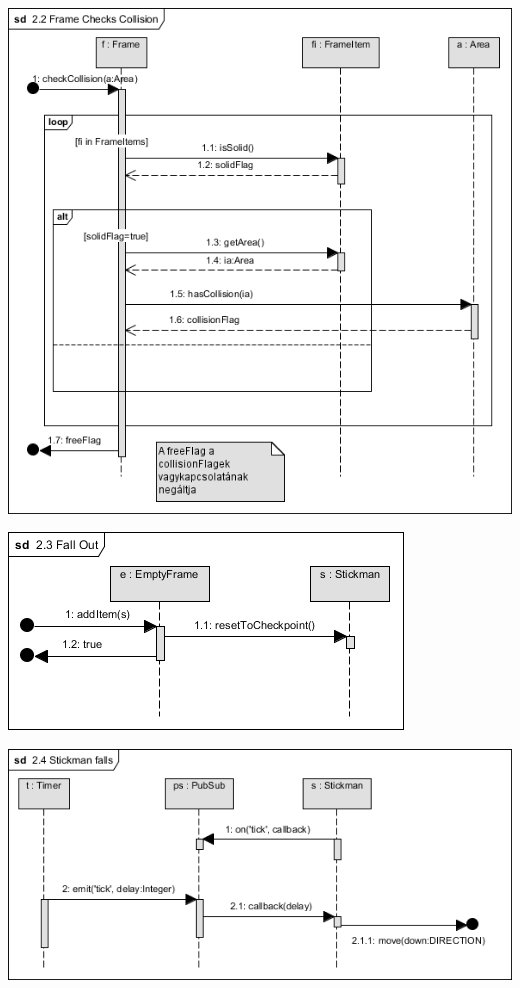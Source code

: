 	    \begin{center}
			\includegraphics[scale=0.8]{resources/seq_2-2_frameChecksCollision.png}
		\end{center}
	
		\begin{center}
			\includegraphics[scale=0.8]{resources/seq_2-3_fallOut.png}
		\end{center}
	
		\begin{center}
			\includegraphics[scale=0.8]{resources/seq_2-4_stickmanFalls.png}
		\end{center}
	
